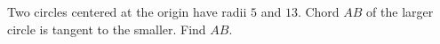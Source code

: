 Two circles centered at the origin have radii $5$ and $13$. Chord $AB$ of the larger circle is tangent to the smaller. Find $AB$.
